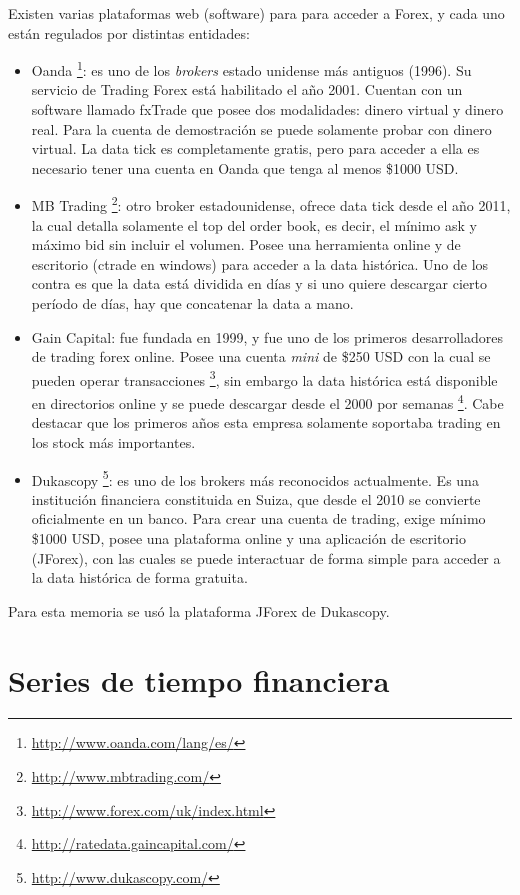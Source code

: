 Existen varias plataformas web (software) para para acceder a Forex, y cada uno
están regulados por distintas entidades:
\begin{itemize}
 \item Oanda \footnote{\url{http://www.oanda.com/lang/es/}}: es uno de los
\emph{brokers} estado unidense más antiguos (1996).  Su servicio de Trading
Forex está habilitado el año 2001. Cuentan con un software llamado fxTrade que
posee dos modalidades: dinero virtual y dinero real. Para la cuenta de
demostración se puede solamente probar con dinero virtual. La data tick es
completamente gratis, pero para acceder a ella es necesario tener una cuenta en
Oanda que tenga al menos \$1000 USD.
 \item MB Trading \footnote{\url{http://www.mbtrading.com/}}: otro broker
estadounidense, ofrece data tick desde el año 2011, la cual detalla solamente
el top del order book, es decir, el mínimo ask y máximo bid sin incluir el
volumen. Posee una herramienta online y de escritorio (ctrade en windows) para
acceder a la data histórica. Uno de los contra es que la data está dividida en
días y si uno quiere descargar cierto período de días, hay que concatenar la
data a mano.
 \item Gain Capital: fue fundada en 1999, y fue uno de los primeros
desarrolladores de trading forex online. Posee una cuenta \emph{mini} de \$250
USD con la cual se pueden operar transacciones
\footnote{\url{http://www.forex.com/uk/index.html}}, sin embargo la data histórica
está disponible en directorios online y se puede descargar desde el 2000 por
semanas \footnote{\url{http://ratedata.gaincapital.com/}}. Cabe destacar que los primeros
años esta empresa solamente soportaba trading en los stock más importantes.
 \item Dukascopy \footnote{\url{http://www.dukascopy.com/}}: es uno de los brokers
más reconocidos actualmente. Es una institución financiera constituida en
Suiza, que desde el 2010 se convierte oficialmente en un banco. Para crear una
cuenta de trading, exige mínimo \$1000 USD, posee una plataforma online y una
aplicación de escritorio (JForex), con las cuales se puede interactuar de forma
simple para acceder a la data histórica de forma gratuita.
\end{itemize}

Para esta memoria se usó la plataforma JForex de Dukascopy.

\section{Series de tiempo financiera}

